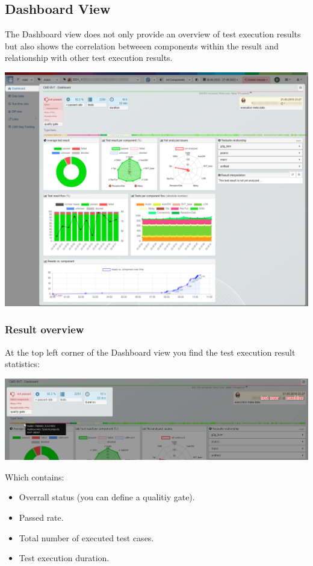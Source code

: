 \hypertarget{dashboard-view}{%
\subsection{Dashboard View}\label{dashboard-view}}
The Dashboard view does not only provide an overview of test execution results but 
also shows the correlation betweeen components within the result and relationship with other test execution results.

\includegraphics[width=1\linewidth]{./pictures/view_dashboard.png}

\subsubsection{Result overview}
At the top left corner of the Dashboard view you find the test execution result 
statistics:

\includegraphics[width=1\linewidth]{./pictures/dashboard/result_statistics.png}

Which contains:
\begin{itemize}
   \item Overrall status (you can define a qualitiy gate).
   \item Passed rate.
   \item Total number of executed test cases.
   \item Test execution duration.
\end{itemize}

